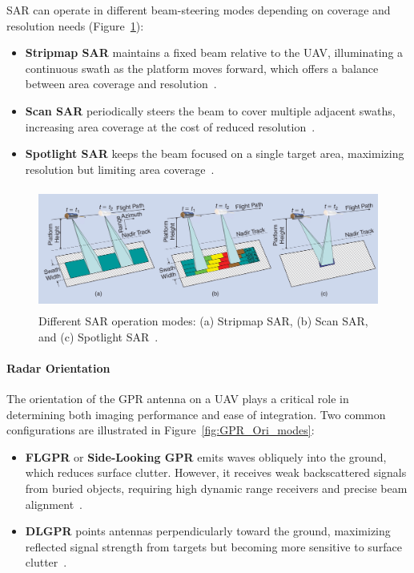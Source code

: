 \gls{SAR} can operate in different beam-steering modes depending on coverage and resolution needs (Figure~\ref{fig:sar_modes}):

\begin{itemize}
    \item \textbf{Stripmap \gls{SAR}} maintains a fixed beam relative to the \gls{UAV}, illuminating a continuous swath as the platform moves forward, which offers a balance between area coverage and resolution~\cite{moreira2013tutorial}.
    \item \textbf{Scan \gls{SAR}} periodically steers the beam to cover multiple adjacent swaths, increasing area coverage at the cost of reduced resolution~\cite{moreira2013tutorial}.
    \item \textbf{Spotlight \gls{SAR}} keeps the beam focused on a single target area, maximizing resolution but limiting area coverage~\cite{moreira2013tutorial}.
\end{itemize}

\begin{figure}[H]
    \centering
    \includegraphics[height=4cm]{figs/Huirui/sar_modes.png}
    \caption[SAR operation modes]{Different SAR operation modes: (a) Stripmap SAR, (b) Scan SAR, and (c) Spotlight SAR~\cite{moreira2013tutorial}.}
    \label{fig:sar_modes}
\end{figure}


\paragraph{Radar Orientation}

The orientation of the \gls{GPR} antenna on a \gls{UAV} plays a critical role in determining both imaging performance and ease of integration. Two common configurations are illustrated in Figure~\ref{fig:GPR_Ori_modes}:

\begin{itemize}
    \item \textbf{\gls{FLGPR}} or \textbf{Side-Looking \gls{GPR}} emits waves obliquely into the ground, which reduces surface clutter. However, it receives weak backscattered signals from buried objects, requiring high dynamic range receivers and precise beam alignment~\cite{garcia2020airborne}.

    \item \textbf{\gls{DLGPR}} points antennas perpendicularly toward the ground, maximizing reflected signal strength from targets but becoming more sensitive to surface clutter~\cite{garcia2020airborne}.
\end{itemize}

